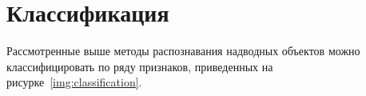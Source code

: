 \chapter{Классификация}

Рассмотренные выше методы распознавания надводных объектов можно классифицировать по ряду признаков, приведенных на рисурке~\ref{img:classification}.

